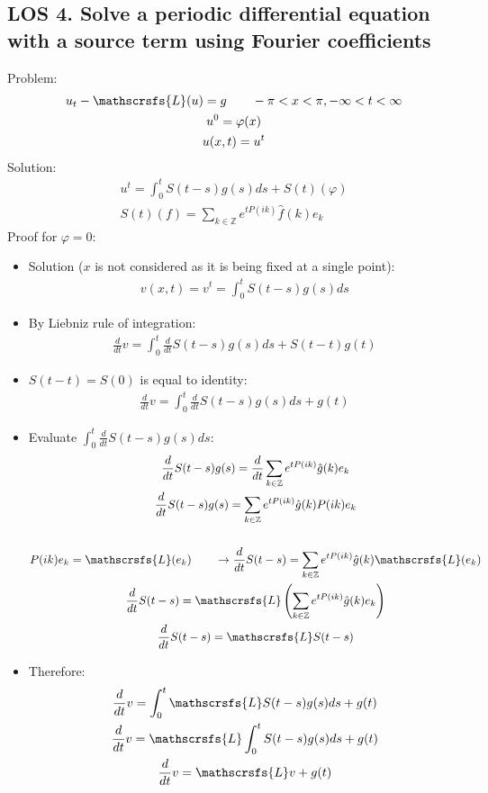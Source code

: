 \documentclass[12pt, a4paper]{article}
\begin{document}
\vspace{0.3em}

\subsection*{LOS 4. Solve a periodic differential equation with a source term using Fourier coefficients}
Problem:
\begin{gather*}
    u_t - \mathscrsfs{L}(u) = g \qquad -\pi<x<\pi, -\infty<t<\infty\\
    u^0 = \varphi(x)\\
    u(x, t) = u^t
\end{gather*}
Solution:
\begin{gather*}
    u^t = \int^t_0 S(t-s)g(s)ds + S(t)(\varphi)\\
    S(t)(f) = \sum_{k \in \mathbb{Z}}e^{tP(ik)}\hat{f}(k)e_k
\end{gather*}
Proof for $\varphi = 0$:
\begin{itemize}
    \item Solution ($x$ is not considered as it is being fixed at a single point):
    \begin{gather*}
        v(x, t) = v^t = \int_0^t S(t-s)g(s)ds
    \end{gather*}
    \item By Liebniz rule of integration:
    \begin{gather*}
        \frac{d}{dt}v = \int^t_0 \frac{d}{dt} S(t-s)g(s)ds + S(t-t)g(t) 
    \end{gather*}
    \item $S(t-t) = S(0)$ is equal to identity:
    \begin{gather*}
        \frac{d}{dt}v = \int^t_0 \frac{d}{dt} S(t-s)g(s)ds + g(t) 
    \end{gather*} 
    \item Evaluate $\int^t_0 \frac{d}{dt} S(t-s)g(s)ds$:
    \begin{gather*}
        \frac{d}{dt} S(t-s)g(s) = \frac{d}{dt}\sum_{k \in \mathbb{Z}}e^{tP(ik)}\hat{g}(k)e_k\\
        \frac{d}{dt} S(t-s)g(s)= \sum_{k \in \mathbb{Z}}e^{tP(ik)}\hat{g}(k)P(ik)e_k\\\\
        P(ik)e_k = \mathscrsfs{L}(e_k) \qquad \rightarrow\frac{d}{dt} S(t-s) = \sum_{k \in \mathbb{Z}}e^{tP(ik)}\hat{g}(k)\mathscrsfs{L}(e_k)\\
        \frac{d}{dt} S(t-s) = \mathscrsfs{L}\left(\sum_{k \in \mathbb{Z}}e^{tP(ik)}\hat{g}(k)e_k\right)\\
        \frac{d}{dt} S(t-s) = \mathscrsfs{L}S(t-s)
    \end{gather*}
    \item Therefore:
    \begin{gather*}
        \frac{d}{dt}v = \int^t_0 \mathscrsfs{L}S(t-s)g(s)ds + g(t)\\
        \frac{d}{dt}v = \mathscrsfs{L}\int^t_0 S(t-s)g(s)ds + g(t)\\
        \frac{d}{dt}v = \mathscrsfs{L}v + g(t)\\
    \end{gather*}
\end{itemize}
\end{document}
